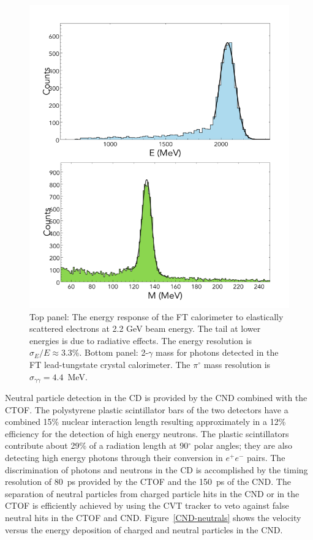 \documentclass[final,3p,twocolumn]{elsarticle}
\begin{document}
\begin{figure}[htbp!]
\centerline{\includegraphics[width=1.15\columnwidth]{FT-performance.png}}
\caption{Top panel: The energy response of the FT calorimeter to elastically scattered electrons at 2.2 GeV beam energy. 
The tail at lower energies is due to radiative effects. The energy resolution is $\sigma_E / E \approx 3.3\%$. 
Bottom panel: 2-$\gamma$ mass for photons detected in the FT lead-tungstate crystal calorimeter. The $\pi^\circ$ 
mass resolution is $\sigma_{\gamma\gamma} = 4.4$~MeV. }

\label{gg}
\end{figure}




Neutral particle detection in the CD is provided by the CND combined with the CTOF. The polystyrene plastic
scintillator bars of the two detectors have a combined 15\% nuclear interaction length resulting approximately in
a 12\% efficiency for the detection of high energy neutrons. The plastic scintillators contribute about 29\% of a
radiation length at 90$^\circ$ polar angles; they are also detecting high energy photons through their conversion
in $e^+e^-$ pairs. The discrimination of photons and neutrons in the CD is  accomplished by the timing resolution of
80~ps provided by the CTOF and the 150~ps of the CND. The separation of neutral particles from charged
particle hits in the CND or in the CTOF is efficiently achieved by using the CVT tracker to veto against false neutral
hits in the CTOF and CND. Figure~\ref{CND-neutrals} shows the velocity versus the energy deposition of charged
and neutral particles in the CND.  
\end{document}
